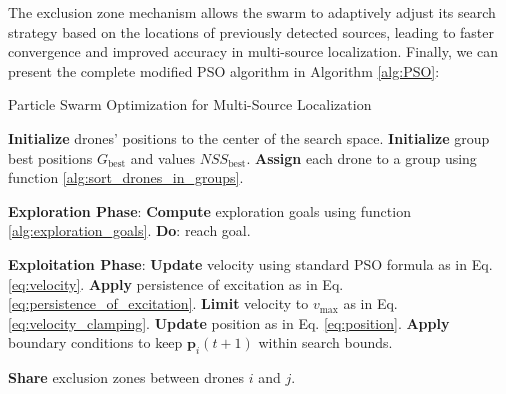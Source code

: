 The exclusion zone mechanism allows the swarm 
to adaptively adjust its search strategy based on the locations 
of previously detected sources, leading to faster convergence 
and improved accuracy in multi-source localization.
Finally, we can present the complete modified PSO algorithm in 
Algorithm \ref{alg:PSO}: 
\begin{algorithm}
    \caption{Particle Swarm Optimization for Multi-Source Localization}\label{alg:PSO}
    \begin{algorithmic}[1]
        \State \textbf{Initialize} drones' positions to the center of the search space.
        \State \textbf{Initialize} group best positions \( G_{\text{best}} \) and values \(\textit{NSS}_{\text{best}}\).
        \State \textbf{Assign} each drone to a group using function \ref{alg:sort_drones_in_groups}.
        
        \State \textbf{Exploration Phase}:
        \State \textbf{Compute} exploration goals using function \ref{alg:exploration_goals}.
            \State \textbf{Do}: reach goal.
        \EndFor

        \State \textbf{Exploitation Phase}:
                \State \textbf{Update} velocity using standard PSO formula as in Eq.\eqref{eq:velocity}.
                \State \textbf{Apply} persistence of excitation as in Eq. \eqref{eq:persistence_of_excitation}.
                \State \textbf{Limit} velocity to \( v_{\text{max}} \) as in Eq. \eqref{eq:velocity_clamping}.
                \State \textbf{Update} position as in Eq. \eqref{eq:position}.
                \State \textbf{Apply} boundary conditions to keep \(\mathbf{p}_i(t+1)\) within search bounds.
                
                            \State \textbf{Share} exclusion zones between drones \( i \) and \( j \).
                        \EndIf
                    \EndIf
                \EndFor
                

\end{algorithmic}
\end{algorithm}
